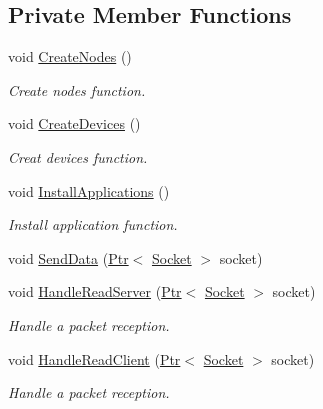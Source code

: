 \subsection*{Private Member Functions}
\begin{DoxyCompactItemize}
\item 
void \hyperlink{classFlameRegressionTest_a65e358d7c06b4a4df04f8a78873bfdac}{Create\+Nodes} ()
\begin{DoxyCompactList}\small\item\em Create nodes function. \end{DoxyCompactList}\item 
void \hyperlink{classFlameRegressionTest_aeee4af77af2814f7339f204135cc2733}{Create\+Devices} ()
\begin{DoxyCompactList}\small\item\em Creat devices function. \end{DoxyCompactList}\item 
void \hyperlink{classFlameRegressionTest_a4ecfd50a2506bba8a65b7143539998b1}{Install\+Applications} ()
\begin{DoxyCompactList}\small\item\em Install application function. \end{DoxyCompactList}\item 
void \hyperlink{classFlameRegressionTest_a8745e5dad068bbfecd1df44601154cb0}{Send\+Data} (\hyperlink{classns3_1_1Ptr}{Ptr}$<$ \hyperlink{classns3_1_1Socket}{Socket} $>$ socket)
\item 
void \hyperlink{classFlameRegressionTest_ab0ea347ba0dff709c8b80ccc4a311390}{Handle\+Read\+Server} (\hyperlink{classns3_1_1Ptr}{Ptr}$<$ \hyperlink{classns3_1_1Socket}{Socket} $>$ socket)
\begin{DoxyCompactList}\small\item\em Handle a packet reception. \end{DoxyCompactList}\item 
void \hyperlink{classFlameRegressionTest_ab0112bb1d87bc8778ba4219f11eae0f6}{Handle\+Read\+Client} (\hyperlink{classns3_1_1Ptr}{Ptr}$<$ \hyperlink{classns3_1_1Socket}{Socket} $>$ socket)
\begin{DoxyCompactList}\small\item\em Handle a packet reception. \end{DoxyCompactList}\end{DoxyCompactItemize}

